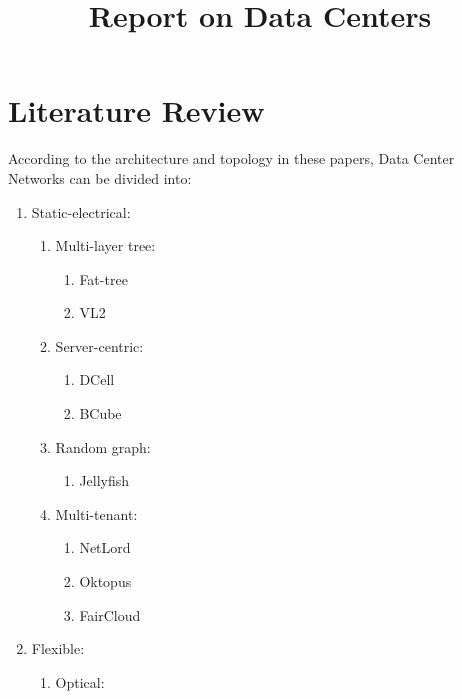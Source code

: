 \documentclass[journal,onecolumn,11pt]{IEEEtran}
\title{Report on Data Centers}
\author{\IEEEauthorblockN{Yongsen MA}
}
\begin{document}
\maketitle%

\section{Literature Review}

According to the architecture and topology in these papers, Data Center Networks can be divided into:
\begin{enumerate}
  \item Static-electrical:
  \begin{enumerate}
    \item Multi-layer tree:
        \begin{enumerate}
          \item Fat-tree \cite{Al-Fares:2008:SCD:1402958.1402967}
          \item VL2 \cite{Greenberg:2009:VSF:1592568.1592576}
        \end{enumerate}
    \item Server-centric:
        \begin{enumerate}
          \item DCell \cite{Guo:2008:DSF:1402958.1402968}
          \item BCube \cite{Guo:2009:BHP:1592568.1592577}
        \end{enumerate}
    \item Random graph:
        \begin{enumerate}
        \item Jellyfish \cite{singla2012jellyfish}
        \end{enumerate}
    \item Multi-tenant:
        \begin{enumerate}
        \item NetLord \cite{Mudigonda:2011:NSM:2018436.2018444}
        \item Oktopus \cite{Ballani:2011:TPD:2018436.2018465}
        \item FairCloud \cite{Popa:2011:FSN:2070562.2070584}
        \end{enumerate}
  \end{enumerate}
  \item Flexible:
  \begin{enumerate}
    \item Optical:
    \begin{enumerate}

\end{enumerate}
\end{enumerate}
\end{enumerate}
\end{document}
